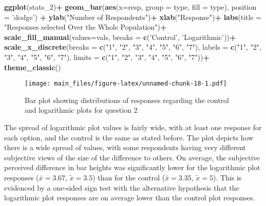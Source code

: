 \documentclass[
]{article}
\newenvironment{Shaded}{\begin{snugshade}}{\end{snugshade}}
\newcommand{\DataTypeTok}[1]{\textcolor[rgb]{0.13,0.29,0.53}{#1}}
\newcommand{\DecValTok}[1]{\textcolor[rgb]{0.00,0.00,0.81}{#1}}
\newcommand{\KeywordTok}[1]{\textcolor[rgb]{0.13,0.29,0.53}{\textbf{#1}}}
\newcommand{\NormalTok}[1]{#1}
\newcommand{\OperatorTok}[1]{\textcolor[rgb]{0.81,0.36,0.00}{\textbf{#1}}}
\newcommand{\StringTok}[1]{\textcolor[rgb]{0.31,0.60,0.02}{#1}}
\begin{document}
\begin{Shaded}
\begin{Highlighting}[]
\KeywordTok{ggplot}\NormalTok{(stats_}\DecValTok{2}\NormalTok{)}\OperatorTok{+}
\StringTok{  }\KeywordTok{geom_bar}\NormalTok{(}\KeywordTok{aes}\NormalTok{(}\DataTypeTok{x=}\NormalTok{resp, }\DataTypeTok{group =}\NormalTok{ type, }\DataTypeTok{fill =}\NormalTok{ type), }\DataTypeTok{position =} \StringTok{'dodge'}\NormalTok{) }\OperatorTok{+}
\StringTok{  }\KeywordTok{ylab}\NormalTok{(}\StringTok{"Number of Respondents"}\NormalTok{)}\OperatorTok{+}
\StringTok{  }\KeywordTok{xlab}\NormalTok{(}\StringTok{"Response"}\NormalTok{)}\OperatorTok{+}
\StringTok{  }\KeywordTok{labs}\NormalTok{(}\DataTypeTok{title =} \StringTok{"Responses selected Over the Whole Population"}\NormalTok{)}\OperatorTok{+}
\StringTok{  }\KeywordTok{scale_fill_manual}\NormalTok{(}\DataTypeTok{values=}\NormalTok{vals, }\DataTypeTok{breaks =} \KeywordTok{c}\NormalTok{(}\StringTok{'Control'}\NormalTok{, }\StringTok{'Logarithmic'}\NormalTok{))}\OperatorTok{+}
\StringTok{  }\KeywordTok{scale_x_discrete}\NormalTok{(}\DataTypeTok{breaks =} \KeywordTok{c}\NormalTok{(}\StringTok{"1"}\NormalTok{, }\StringTok{"2"}\NormalTok{, }\StringTok{"3"}\NormalTok{, }\StringTok{"4"}\NormalTok{, }\StringTok{"5"}\NormalTok{, }\StringTok{"6"}\NormalTok{, }\StringTok{"7"}\NormalTok{), }\DataTypeTok{labels =} \KeywordTok{c}\NormalTok{(}\StringTok{"1"}\NormalTok{, }\StringTok{"2"}\NormalTok{, }\StringTok{"3"}\NormalTok{, }\StringTok{"4"}\NormalTok{, }\StringTok{"5"}\NormalTok{, }\StringTok{"6"}\NormalTok{, }\StringTok{"7"}\NormalTok{), }\DataTypeTok{limits =} \KeywordTok{c}\NormalTok{(}\StringTok{"1"}\NormalTok{, }\StringTok{"2"}\NormalTok{, }\StringTok{"3"}\NormalTok{, }\StringTok{"4"}\NormalTok{, }\StringTok{"5"}\NormalTok{, }\StringTok{"6"}\NormalTok{, }\StringTok{"7"}\NormalTok{))}\OperatorTok{+}
\StringTok{  }\KeywordTok{theme_classic}\NormalTok{()}
\end{Highlighting}
\end{Shaded}

\begin{figure}
\centering
\texttt{[image: main\_files/figure-latex/unnamed-chunk-18-1.pdf]}
\caption{Bar plot showing distributions of responses regarding the
control and logarithmic plots for question 2}
\end{figure}

The spread of logarithmic plot values is fairly wide, with at least one
response for each option, and the control is the same as stated before.
The plot depicts how there is a wide spread of values, with some
respondents having very different subjective views of the size of the
difference to others. On average, the subjective perceived difference in
bar heights was significantly lower for the logarithmic plot responses
(\(\bar{x}=3.67\), \(\tilde{x}=3.5\)) than for the control
(\(\bar{x}=3.35\), \(\tilde{x}=5\)). This is evidenced by a one-sided
sign test with the alternative hypothesis that the logarithmic plot
responses are on average lower than the control plot responses.
\end{document}
